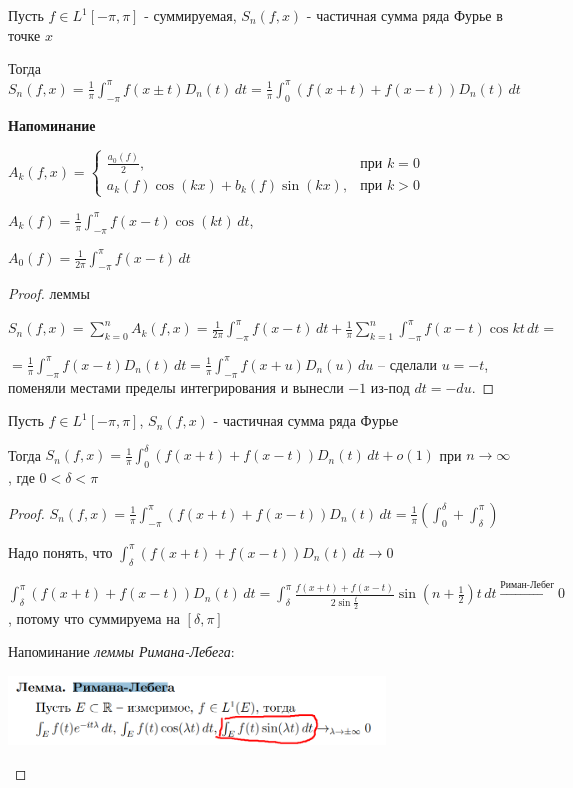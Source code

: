 \begin{lemma}
    Пусть $f \in L^1 [-\pi, \pi]$ - суммируемая, $S_n (f, x)$ - частичная сумма ряда Фурье в точке $x$

    Тогда $S_n (f, x) = \frac{1}{\pi} \int_{-\pi}^\pi f(x \pm t) D_n (t) \, dt = \frac{1}{\pi} \int_0^\pi (f(x + t) + f(x - t)) D_n (t) \, dt$
\end{lemma}

\textbf{Напоминание}

$A_k (f, x) = 
\begin{cases}
    \frac{a_0 (f)}{2}, & \text{при $k = 0$} \\
    a_k (f) \cos (kx) + b_k (f) \sin (kx), & \text{при $k > 0$}
\end{cases}$

$A_k (f) = \frac{1}{\pi} \int_{-\pi}^\pi f(x - t) \cos (kt) \, dt$,

$A_0 (f) = \frac{1}{2\pi} \int_{-\pi}^\pi f(x - t) \, dt$

\begin{proof}
    леммы

    $S_n (f, x) = \sum_{k = 0}^n A_k (f, x) = \frac{1}{2\pi} \int_{-\pi}^\pi f(x - t) \, dt +  \frac{1}{\pi} \sum_{k = 1}^{n} \int_{-\pi}^\pi f(x - t) \cos kt \, dt = $
    
    $=\frac{1}{\pi} \int_{-\pi}^\pi f(x - t) D_n (t) \, dt = \frac{1}{\pi} \int_{-\pi}^\pi f(x + u) D_n (u) \, du$ -- сделали $u = -t$, поменяли местами пределы интегрирования и вынесли $-1$ из-под $dt = -du$. 
\end{proof}

\begin{consequence}
    Пусть $f \in L^1 [-\pi, \pi]$, $S_n (f, x)$ - частичная сумма ряда Фурье

    Тогда $S_n (f, x) = \frac{1}{\pi} \int_0^\delta (f(x + t) + f(x - t)) D_n (t) \, dt + o(1)$ при $n \to \infty$, где $0 < \delta < \pi$
\end{consequence}

\begin{proof}
    $S_n (f, x) = \frac{1}{\pi} \int_{-\pi}^\pi (f(x + t) + f(x - t)) D_n (t) \,  dt = \frac{1}{\pi} \left( \int_{0}^\delta + \int_\delta^\pi \right)$

    Надо понять, что $\int_{\delta}^\pi (f(x + t) + f(x - t)) D_n (t) \,  dt \rightarrow 0$

    $\int_{\delta}^\pi (f(x + t) + f(x - t)) D_n (t) \,  dt = \int_\delta^\pi \frac{f(x + t) + f(x - t)}{2 \sin \frac{t}{2}} \sin (n + \frac{1}{2}) t \, dt \overset{\text{Риман-Лебег}}{\rightarrow} 0$, потому что суммируема на $[\delta, \pi]$

    Напоминание \textit{леммы Римана-Лебега}:

    \begin{center}
        \includegraphics[width=10cm]{assets/05-fourierreihe/notice-riman-lebegue.png}
    \end{center}
\end{proof}

